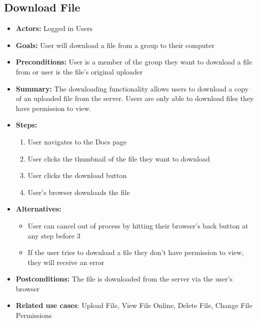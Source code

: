      \subsection{Download File}
     \begin{itemize}
          \item{\textbf{Actors:} Logged in Users}
          \item{\textbf{Goals:} User will download a file from a group to  
                 their computer}
          \item{\textbf{Preconditions:} User is a member of the 
                 group they want to download a file from or user is the 
		   file's original uploader}
          \item{\textbf{Summary:} The downloading functionality allows users to 
		   download a copy of an uploaded file from the server.  Users are 
		   only able to download files they have permission to view.}
	  \item{\textbf{Steps:}}
	  \begin{enumerate}
	       \item{User navigates to the Docs page}
	       \item{User clicks the thumbnail of the file they want to download}
	       \item{User clicks the download button}
	       \item{User's browser downloads the file}
	  \end{enumerate}
	  \item{\textbf{Alternatives:}}
	  \begin{itemize}
	       \item{User can cancel out of process by hitting their 
		     browser's back button at any step before 3}
	       \item{If the user tries to download a file they don't have
		      permission to view, they will receive an error}
	  \end{itemize}
	  \item{\textbf{Postconditions:} The file is downloaded from the server 
		  via the user's browser}
	  \item{\textbf{Related use cases}: Upload File, View File Online, 
		  Delete File, Change File Permissions}
     \end{itemize}


